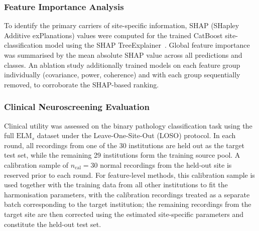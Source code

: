 \documentclass[preprint,12pt]{elsarticle}
\begin{document}
\subsubsection{Feature Importance Analysis}
\label{subsubsec:shap}

To identify the primary carriers of site-specific information,
SHAP (SHapley Additive exPlanations) values were computed for the
trained CatBoost site-classification model using the SHAP
TreeExplainer~\cite{lundberg2017unified}.
Global feature importance was summarised by the mean absolute SHAP
value across all predictions and classes.
An ablation study additionally trained models on each feature group
individually (covariance, power, coherence) and with each group
sequentially removed, to corroborate the SHAP-based ranking.



\subsubsection{Clinical Neuroscreening Evaluation}
\label{subsubsec:clinical_eval}

Clinical utility was assessed on the binary pathology classification
task using the full $\mathrm{ELM}_s$ dataset under the
Leave-One-Site-Out (LOSO) protocol.
In each round, all recordings from one of the 30 institutions are
held out as the target test set, while the remaining 29 institutions
form the training source pool.
A calibration sample of $n_{\mathrm{cal}} = 30$ normal recordings
from the held-out site is reserved prior to each round.
For feature-level methods, this calibration sample is used together
with the training data from all other institutions to fit the
harmonisation parameters, with the calibration recordings treated as
a separate batch corresponding to the target institution; the
remaining recordings from the target site are then corrected using
the estimated site-specific parameters and constitute the held-out
test set.
\end{document}
